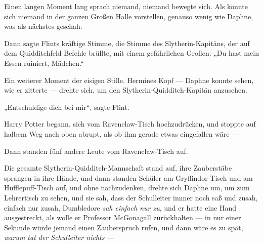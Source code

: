 Einen langen Moment lang sprach niemand, niemand bewegte sich. Als könnte sich niemand in der ganzen Großen Halle vorstellen, genauso wenig wie Daphne, was als nächstes geschah.

Dann sagte Flints kräftige Stimme, die Stimme des Slytherin-Kapitäns, der auf dem Quidditchfeld Befehle brüllte, mit einem gefährlichen Grollen:
„Du hast mein Essen ruiniert, Mädchen.“

Ein weiterer Moment der eisigen Stille. Hermines Kopf — Daphne konnte sehen, wie er zitterte — drehte sich, um den Slytherin-Quidditch-Kapitän anzusehen.

„Entschuldige dich bei mir“, sagte Flint.

Harry Potter begann, sich vom Ravenclaw-Tisch hochzudrücken, und stoppte auf halbem Weg nach oben abrupt, als ob ihm gerade etwas eingefallen wäre —

Dann standen fünf andere Leute vom Ravenclaw-Tisch auf.

Die gesamte Slytherin-Quidditch-Mannschaft stand auf, ihre Zauberstäbe sprangen in ihre Hände, und dann standen Schüler am Gryffindor-Tisch und am Hufflepuff-Tisch auf, und ohne nachzudenken, drehte sich Daphne um, um zum Lehrertisch zu sehen, und sie sah, dass der Schulleiter immer noch saß und zusah, einfach nur zusah, Dumbledore \emph{sah einfach nur zu}, und er hatte eine Hand ausgestreckt, als wolle er Professor McGonagall zurückhalten — in nur einer Sekunde würde jemand einen Zauberspruch rufen, und dann wäre es zu spät, \emph{warum tat der Schulleiter nichts} —

